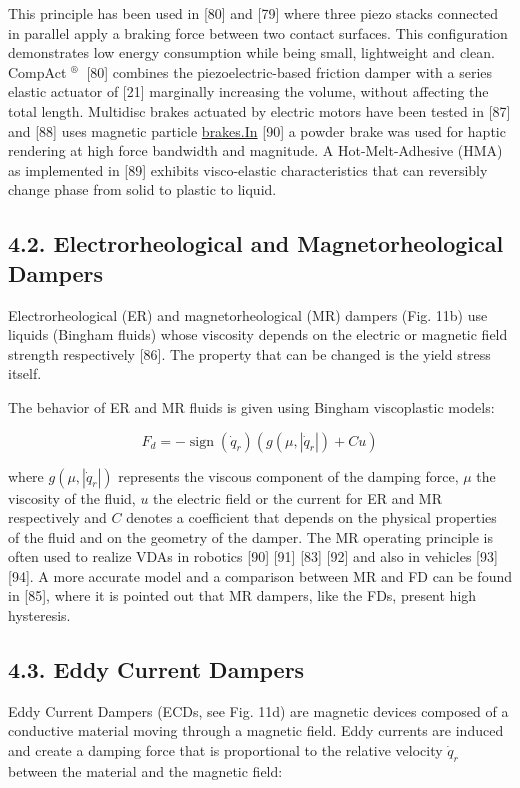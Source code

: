 \documentclass[10pt]{article}
\begin{document}
This principle has been used in [80] and [79] where three piezo stacks connected in parallel apply a braking force between two contact surfaces. This configuration demonstrates low energy consumption while being small, lightweight and clean. CompAct ${ }^{\text {® }}$ [80] combines the piezoelectric-based friction damper with a series elastic actuator of [21] marginally increasing the volume, without affecting the total length. Multidisc brakes actuated by electric motors have been tested in [87] and [88] uses magnetic particle \href{http://brakes.In}{brakes.In} [90] a powder brake was used for haptic rendering at high force bandwidth and magnitude. A Hot-Melt-Adhesive (HMA) as implemented in [89] exhibits visco-elastic characteristics that can reversibly change phase from solid to plastic to liquid.

\subsection*{4.2. Electrorheological and Magnetorheological Dampers}
Electrorheological (ER) and magnetorheological (MR) dampers (Fig. 11b) use liquids (Bingham fluids) whose viscosity depends on the electric or magnetic field strength respectively [86]. The property that can be changed is the yield stress itself.

The behavior of ER and MR fluids is given using Bingham viscoplastic models:


\begin{equation*}
F_{d}=-\operatorname{sign}\left(\dot{q}_{r}\right)\left(g\left(\mu,\left|\dot{q}_{r}\right|\right)+C u\right) \tag{3}
\end{equation*}


where $g\left(\mu,\left|\dot{q}_{r}\right|\right)$ represents the viscous component of the damping force, $\mu$ the viscosity of the fluid, $u$ the electric field or the current for ER and MR respectively and $C$ denotes a coefficient that depends on the physical properties of the fluid and on the geometry of the damper. The MR operating principle is often used to realize VDAs in robotics [90] [91] [83] [92] and also in vehicles [93] [94]. A more accurate model and a comparison between MR and FD can be found in [85], where it is pointed out that MR dampers, like the FDs, present high hysteresis.

\subsection*{4.3. Eddy Current Dampers}
Eddy Current Dampers (ECDs, see Fig. 11d) are magnetic devices composed of a conductive material moving through a magnetic field. Eddy currents are induced and create a damping force that is proportional to the relative velocity $\dot{q}_{r}$ between the material and the magnetic field:
\end{document}

